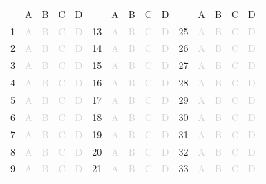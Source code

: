 \documentclass[a4paper,11pt]{article}
\newcommand{\light}[1]{\textcolor{lightgray}{#1}}
\begin{document}
\begin{center}
\small
\begin{tabular}{r|c|c|c|c|r|c|c|c|c|r|c|c|c|c|}
\multicolumn{1}{c}{} &
\multicolumn{1}{c}{A}&
\multicolumn{1}{c}{B}&
\multicolumn{1}{c}{C}&
\multicolumn{1}{c}{D}& \multicolumn{1}{c}{} &
\multicolumn{1}{c}{A}&
\multicolumn{1}{c}{B}&
\multicolumn{1}{c}{C}&
\multicolumn{1}{c}{D}& \multicolumn{1}{c}{} &
\multicolumn{1}{c}{A}&
\multicolumn{1}{c}{B}&
\multicolumn{1}{c}{C}&
\multicolumn{1}{c}{D}\\ 
\cline{2-5} \cline{7-10} \cline{12-15}
1& \light{A} & \light{B} & \light{C} & \light{D} & 13& \light{A} & \light{B} & \light{C} & \light{D} & 25& \light{A} & \light{B} & \light{C} & \light{D} \\ 
\cline{2-5} \cline{7-10} \cline{12-15}
2& \light{A} & \light{B} & \light{C} & \light{D} & 14& \light{A} & \light{B} & \light{C} & \light{D} & 26& \light{A} & \light{B} & \light{C} & \light{D} \\ 
\cline{2-5} \cline{7-10} \cline{12-15}
3& \light{A} & \light{B} & \light{C} & \light{D} & 15& \light{A} & \light{B} & \light{C} & \light{D} & 27& \light{A} & \light{B} & \light{C} & \light{D} \\ 
\cline{2-5} \cline{7-10} \cline{12-15}
4& \light{A} & \light{B} & \light{C} & \light{D} & 16& \light{A} & \light{B} & \light{C} & \light{D} & 28& \light{A} & \light{B} & \light{C} & \light{D} \\ 
\cline{2-5} \cline{7-10} \cline{12-15}
5& \light{A} & \light{B} & \light{C} & \light{D} & 17& \light{A} & \light{B} & \light{C} & \light{D} & 29& \light{A} & \light{B} & \light{C} & \light{D} \\ 
\cline{2-5} \cline{7-10} \cline{12-15}
6& \light{A} & \light{B} & \light{C} & \light{D} & 18& \light{A} & \light{B} & \light{C} & \light{D} & 30& \light{A} & \light{B} & \light{C} & \light{D} \\ 
\cline{2-5} \cline{7-10} \cline{12-15}
7& \light{A} & \light{B} & \light{C} & \light{D} & 19& \light{A} & \light{B} & \light{C} & \light{D} & 31& \light{A} & \light{B} & \light{C} & \light{D} \\ 
\cline{2-5} \cline{7-10} \cline{12-15}
8& \light{A} & \light{B} & \light{C} & \light{D} & 20& \light{A} & \light{B} & \light{C} & \light{D} & 32& \light{A} & \light{B} & \light{C} & \light{D} \\ 
\cline{2-5} \cline{7-10} \cline{12-15}
9& \light{A} & \light{B} & \light{C} & \light{D} & 21& \light{A} & \light{B} & \light{C} & \light{D} & 33& \light{A} & \light{B} & \light{C} & \light{D} \\ 

\end{tabular}
\end{center}
\end{document}
